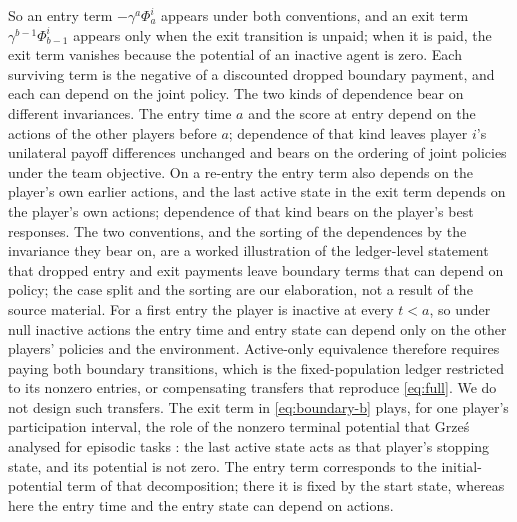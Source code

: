 \documentclass{article}
\begin{document}
So an entry term \(-\gamma^a\Phi_a^i\) appears under both conventions, and an exit term \(\gamma^{b-1}\Phi_{b-1}^i\) appears only when the exit transition is unpaid; when it is paid, the exit term vanishes because the potential of an inactive agent is zero. Each surviving term is the negative of a discounted dropped boundary payment, and each can depend on the joint policy. The two kinds of dependence bear on different invariances. The entry time \(a\) and the score at entry depend on the actions of the other players before \(a\); dependence of that kind leaves player \(i\)'s unilateral payoff differences unchanged and bears on the ordering of joint policies under the team objective. On a re-entry the entry term also depends on the player's own earlier actions, and the last active state in the exit term depends on the player's own actions; dependence of that kind bears on the player's best responses. The two conventions, and the sorting of the dependences by the invariance they bear on, are a worked illustration of the ledger-level statement that dropped entry and exit payments leave boundary terms that can depend on policy; the case split and the sorting are our elaboration, not a result of the source material. For a first entry the player is inactive at every \(t<a\), so under null inactive actions the entry time and entry state can depend only on the other players' policies and the environment. Active-only equivalence therefore requires paying both boundary transitions, which is the fixed-population ledger restricted to its nonzero entries, or compensating transfers that reproduce \eqref{eq:full}. We do not design such transfers.
The exit term in \eqref{eq:boundary-b} plays, for one player's participation interval, the role of the nonzero terminal potential that Grze\'s analysed for episodic tasks \cite{grzes2017reward}: the last active state acts as that player's stopping state, and its potential is not zero. The entry term corresponds to the initial-potential term of that decomposition; there it is fixed by the start state, whereas here the entry time and the entry state can depend on actions.
\end{document}
